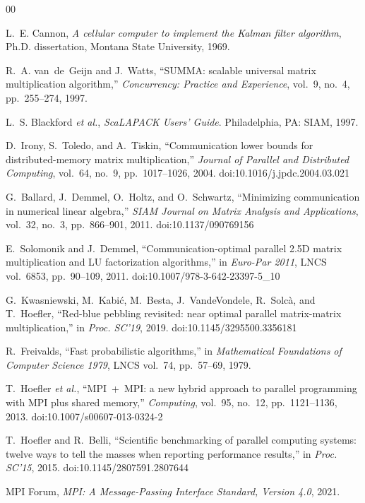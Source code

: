 \documentclass[conference,10pt]{IEEEtran}
\begin{document}
\label{endofcontent}
\begin{thebibliography}{00}

L.~E. Cannon, \emph{A cellular computer to implement the Kalman filter
algorithm}, Ph.D. dissertation, Montana State University, 1969.

R.~A. van~de~Geijn and J.~Watts, ``SUMMA: scalable universal matrix
multiplication algorithm,'' \emph{Concurrency: Practice and Experience},
vol.~9, no.~4, pp.~255--274, 1997.

L.~S. Blackford \emph{et al.}, \emph{ScaLAPACK Users' Guide}. Philadelphia,
PA: SIAM, 1997.

D.~Irony, S.~Toledo, and A.~Tiskin, ``Communication lower bounds for
distributed-memory matrix multiplication,'' \emph{Journal of Parallel and
Distributed Computing}, vol.~64, no.~9, pp.~1017--1026, 2004.
doi:10.1016/j.jpdc.2004.03.021

G.~Ballard, J.~Demmel, O.~Holtz, and O.~Schwartz, ``Minimizing communication in
numerical linear algebra,'' \emph{SIAM Journal on Matrix Analysis and
Applications}, vol.~32, no.~3, pp.~866--901, 2011. doi:10.1137/090769156

E.~Solomonik and J.~Demmel, ``Communication-optimal parallel 2.5D matrix
multiplication and LU factorization algorithms,'' in \emph{Euro-Par 2011},
LNCS vol.~6853, pp.~90--109, 2011. doi:10.1007/978-3-642-23397-5\_10

G.~Kwasniewski, M.~Kabi\'c, M.~Besta, J.~VandeVondele, R.~Solc\`a, and
T.~Hoefler, ``Red-blue pebbling revisited: near optimal parallel matrix-matrix
multiplication,'' in \emph{Proc. SC'19}, 2019. doi:10.1145/3295500.3356181

R.~Freivalds, ``Fast probabilistic algorithms,'' in \emph{Mathematical
Foundations of Computer Science 1979}, LNCS vol.~74, pp.~57--69, 1979.

T.~Hoefler \emph{et al.}, ``MPI~+~MPI: a new hybrid approach to parallel
programming with MPI plus shared memory,'' \emph{Computing}, vol.~95, no.~12,
pp.~1121--1136, 2013. doi:10.1007/s00607-013-0324-2

T.~Hoefler and R.~Belli, ``Scientific benchmarking of parallel computing
systems: twelve ways to tell the masses when reporting performance results,''
in \emph{Proc. SC'15}, 2015. doi:10.1145/2807591.2807644

MPI Forum, \emph{MPI: A Message-Passing Interface Standard, Version 4.0}, 2021.

\end{thebibliography}
\end{document}
